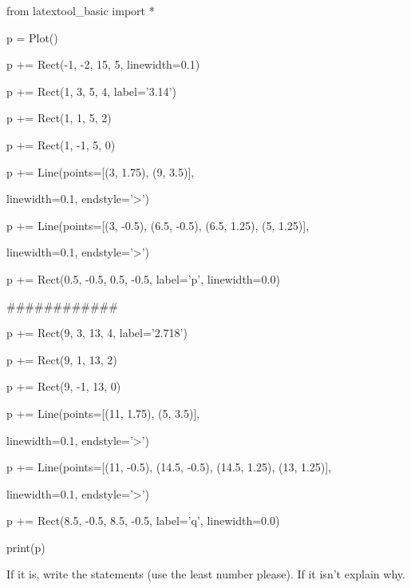 \begin{python}

from latextool_basic import *

p = Plot()



p += Rect(-1, -2, 15, 5, linewidth=0.1)



p += Rect(1, 3, 5, 4, label='3.14')

p += Rect(1, 1, 5, 2)

p += Rect(1, -1, 5, 0)



p += Line(points=[(3, 1.75), (9, 3.5)],

          linewidth=0.1, endstyle='>')

p += Line(points=[(3, -0.5), (6.5, -0.5), (6.5, 1.25), (5, 1.25)],

          linewidth=0.1, endstyle='>')



p += Rect(0.5, -0.5, 0.5, -0.5, label='p', linewidth=0.0)

############



p += Rect(9, 3, 13, 4, label='2.718')

p += Rect(9, 1, 13, 2)

p += Rect(9, -1, 13, 0)



p += Line(points=[(11, 1.75),  (5, 3.5)],

          linewidth=0.1, endstyle='>')

p += Line(points=[(11, -0.5), (14.5, -0.5), (14.5, 1.25), (13, 1.25)],

          linewidth=0.1, endstyle='>')



p += Rect(8.5, -0.5, 8.5, -0.5, label='q', linewidth=0.0)



print(p)

\end{python}



If it is, write the statements (use the least number please). If it isn't explain why.

